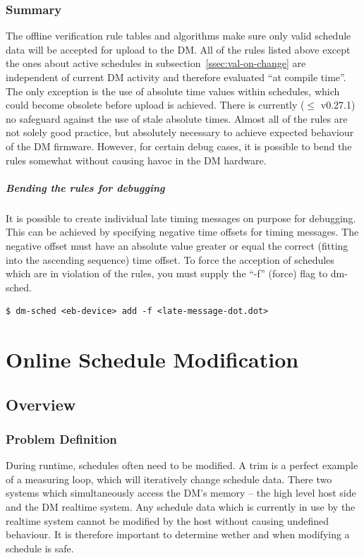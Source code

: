 \subsection{Summary}
The offline verification rule tables and algorithms make sure only valid schedule data will be accepted for upload to the DM. 
All of the rules listed above except the ones about active schedules in subsection~\ref{ssec:val-on-change} are independent of current DM activity and therefore evaluated \enquote{at compile time}.
The only exception is the use of absolute time values within schedules, which could become obsolete before upload is achieved. There is currently ($\le$ v0.27.1) no safeguard against the use of stale absolute times.
Almost all of the rules are not solely good practice, but absolutely necessary to achieve expected behaviour of the DM firmware. However, for certain debug cases, it is possible to bend the rules somewhat without causing havoc in the DM hardware.

\paragraph{Bending the rules for debugging}
%
It is possible to create individual late timing messages on purpose for debugging. This can be achieved by specifying negative time offsets for timing messages. The negative offset must have an absolute value greater or equal the correct (fitting into the ascending sequence) time offset. To force the acception of schedules which are in violation of the rules, you must supply the \enquote{-f} (force) flag to dm-sched. 
\begin{lstlisting}[style = customshell]
$ dm-sched <eb-device> add -f <late-message-dot.dot>
\end{lstlisting}

\chapter{Online Schedule Modification}
\label{chap:online-sched-mod}
\section{Overview}

\subsection{Problem Definition}

During runtime, schedules often need to be modified. A trim is a perfect example of a measuring loop, which will iteratively change schedule data.
There two systems which simultaneously access the DM's memory -- the high level host side and the DM realtime system.
Any schedule data which is currently in use by the realtime system cannot be modified by the host without causing undefined behaviour.
It is therefore important to determine wether and when modifying a schedule is safe.

